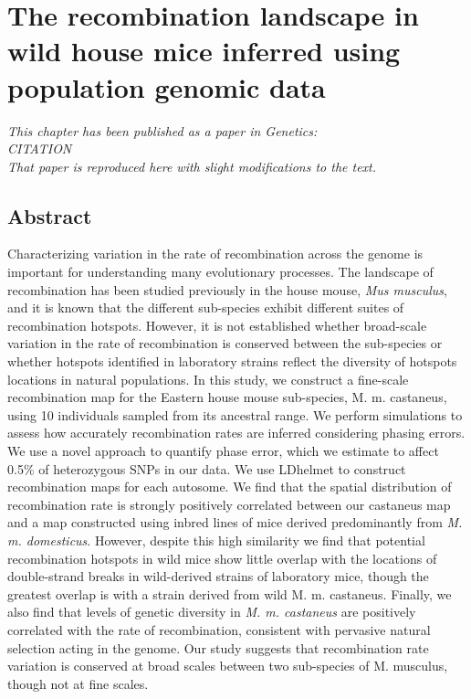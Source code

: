 \chapter{The recombination landscape in wild house mice inferred using population genomic data}

\emph{This chapter has been published as a paper in Genetics: \\CITATION\\That paper is reproduced here with slight modifications to the text.}
\section{Abstract}
 
Characterizing variation in the rate of recombination across the genome is important for understanding many evolutionary processes. The landscape of recombination has been studied previously in the house mouse, \emph{Mus musculus}, and it is known that the different sub-species exhibit different suites of recombination hotspots. However, it is not established whether broad-scale variation in the rate of recombination is conserved between the sub-species or whether hotspots identified in laboratory strains reflect the diversity of hotspots locations in natural populations. In this study, we construct a fine-scale recombination map for the Eastern house mouse sub-species, M. m. castaneus, using 10 individuals sampled from its ancestral range. We perform simulations to assess how accurately recombination rates are inferred considering phasing errors. We use a novel approach to quantify phase error, which we estimate to affect 0.5\% of heterozygous SNPs in our data. We use LDhelmet to construct recombination maps for each autosome. We find that the spatial distribution of recombination rate is strongly positively correlated between our castaneus map and a map constructed using inbred lines of mice derived predominantly from \emph{M. m. domesticus}. However, despite this high similarity we find that potential recombination hotspots in wild mice show little overlap with the locations of double-strand breaks in wild-derived strains of laboratory mice, though the greatest overlap is with a strain derived from wild M. m. castaneus. Finally, we also find that levels of genetic diversity in \emph{M. m. castaneus} are positively correlated with the rate of recombination, consistent with pervasive natural selection acting in the genome. Our study suggests that recombination rate variation is conserved at broad scales between two sub-species of M. musculus, though not at fine scales.

